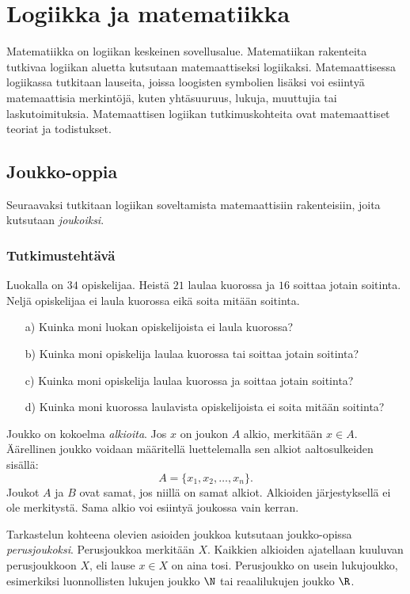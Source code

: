 \chapter{Logiikka ja matematiikka}

Matematiikka on logiikan keskeinen sovellusalue. Matematiikan rakenteita tutkivaa logiikan aluetta kutsutaan matemaattiseksi logiikaksi. Matemaattisessa logiikassa tutkitaan lauseita, joissa loogisten symbolien lisäksi voi esiintyä matemaattisia merkintöjä, kuten yhtäsuuruus, lukuja, muuttujia tai laskutoimituksia. Matemaattisen logiikan tutkimuskohteita ovat matemaattiset teoriat ja todistukset.


\section{Joukko-oppia}%
Seuraavaksi tutkitaan logiikan soveltamista matemaattisiin rakenteisiin, joita kutsutaan {\em joukoiksi}.

\subsection*{Tutkimustehtävä}
Luokalla on $34$ opiskelijaa. Heistä $21$ laulaa kuorossa ja $16$ soittaa jotain soitinta. Neljä opiskelijaa ei laula kuorossa eikä soita mitään soitinta.
\begin{itemize}
\item[a)] Kuinka moni luokan opiskelijoista ei laula kuorossa?
\item[b)] Kuinka moni opiskelija laulaa kuorossa tai soittaa jotain soitinta?
\item[c)] Kuinka moni opiskelija laulaa kuorossa ja soittaa jotain soitinta?
\item[d)] Kuinka moni kuorossa laulavista opiskelijoista ei soita mitään soitinta?
\end{itemize}

Joukko on kokoelma {\em alkioita}. Jos $x$ on joukon $A$ alkio, merkitään $x\in A$. Äärellinen joukko voidaan määritellä luettelemalla sen alkiot aaltosulkeiden sisällä:
\[
 A = \{ x_1,x_2,\ldots,x_n\}.
\]
Joukot $A$ ja $B$ ovat samat, jos niillä on samat alkiot. Alkioiden jär\-jes\-tyk\-sel\-lä ei ole merkitystä. Sama alkio voi esiintyä joukossa vain kerran.

Tarkastelun kohteena olevien asioiden joukkoa kutsutaan joukko-opissa {\em perusjoukoksi}. Perusjoukkoa merkitään $X$. Kaikkien alkioiden ajatellaan kuuluvan perusjoukkoon $X$, eli lause $x\in X$ on aina tosi. Perusjoukko on usein lukujoukko, esimerkiksi luonnollisten lukujen joukko $\N$ tai reaalilukujen joukko $\R$.

